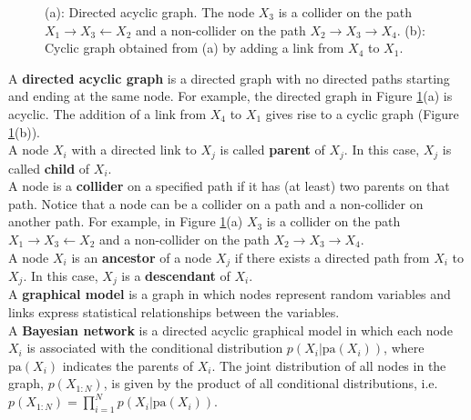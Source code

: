 \begin{figure}
\centering
{}
\hskip0.2cm
\caption{(a): Directed acyclic graph. The node $X_3$ is a collider on the path $X_1 \rightarrow X_3 \leftarrow X_2$ and a non-collider on the path $X_2\rightarrow X_3\rightarrow X_4$. (b): Cyclic graph obtained from (a) by adding a link from $X_4$ to $X_1$.}
\label{fig:indep_HMM}
\vspace{-0.75cm}
\end{figure}A {\bf directed acyclic graph} is a directed graph with no
directed paths starting and ending at the same node. For example, the directed graph in Figure \ref{fig:indep_HMM}(a) is acyclic. 
The addition of a link from $X_4$ to $X_1$ gives rise to a cyclic graph (Figure \ref{fig:indep_HMM}(b)).\\[5pt]
A node $X_i$ with a directed link to $X_j$ is called {\bf parent}
of $X_j$. In this case, $X_j$ is called {\bf child} of $X_i$.\\[5pt]
A node is a {\bf collider} on a specified path if it has (at least) two parents on that path.
Notice that a node can be a collider on a path and a non-collider on another path. For example, in Figure \ref{fig:indep_HMM}(a) $X_3$ is a collider on the path $X_1 \rightarrow X_3 \leftarrow X_2$ and a non-collider on the path $X_2\rightarrow X_3\rightarrow X_4$.\\[5pt]
A node $X_i$ is an {\bf ancestor} of a node $X_j$ if there exists a directed path from $X_i$ to $X_j$. In this case, $X_j$ is a {\bf descendant} of $X_i$.\\[5pt]
A {\bf graphical model} is a graph in which nodes represent random variables and links express statistical relationships between the variables.\\[5pt]
A {\bf Bayesian network} is a directed acyclic graphical model in which each node $X_i$ is associated
with the conditional distribution $p(X_i|\text{pa}(X_i))$, where $\text{pa}(X_i)$ indicates the parents of $X_i$. The joint distribution of all nodes in
the graph, $p(X_{1:N})$, is given by the product of all conditional distributions, i.e. $p(X_{1:N})=\prod_{i=1}^Np(X_i|\text{pa}(X_i))$.

